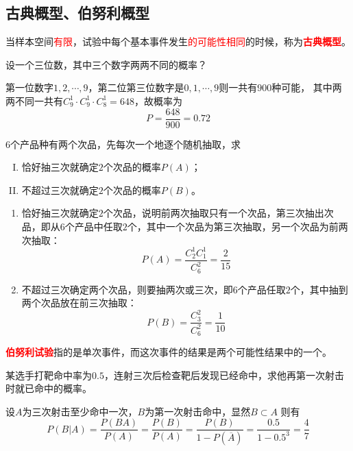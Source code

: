 \subsection{古典概型、伯努利概型}
当样本空间\textcolor{red}{有限}，试验中每个基本事件发生\textcolor{red}{的可能性相同}的时候，称为\textcolor{red}{\textbf{\textsf{古典概型}}}。
\begin{example}
    设一个三位数，其中三个数字两两不同的概率？
\end{example}
\begin{solution}
    第一位数字$1,2,\cdots,9$，第二位第三位数字是$0,1,\cdots,9$则一共有$900$种可能，
    其中两两不同一共有$C_9^1\cdot C_9^1\cdot C_8^1=648$，故概率为
    \[ P=\frac{648}{900} = 0.72 \]
\end{solution}
\begin{example}
    $6$个产品种有两个次品，先每次一个地逐个随机抽取，求
    \begin{enumerate}[(I)]
        \item 恰好抽三次就确定$2$个次品的概率$P(A)$；
        \item 不超过三次就确定$2$个次品的概率$P(B)$。
    \end{enumerate}
\end{example}
\begin{solution}
    \begin{enumerate}[(1)]
        \item 恰好抽三次就确定$2$个次品，说明前两次抽取只有一个次品，第三次抽出次品，即从$6$个产品中任取$2$个，其中一个次品为第三次抽取，另一个次品为前两次抽取：
              \[ P(A) = \frac{C_2^1C_1^1}{C_6^2} = \frac{2}{15} \]
        \item 不超过三次确定两个次品，则要抽两次或三次，即$6$个产品任取$2$个，其中抽到两个次品放在前三次抽取：
              \[ P(B) = \frac{C_3^2}{C_6^2} = \frac{1}{10} \]
    \end{enumerate}
\end{solution}

\textcolor{red}{\textbf{\textsf{伯努利试验}}}指的是单次事件，而这次事件的结果是两个可能性结果中的一个。
\begin{example}
    某选手打靶命中率为$0.5$，连射三次后检查靶后发现已经命中，求他再第一次射击时就已命中的概率。
\end{example}
\begin{solution}
    设$A$为三次射击至少命中一次，$B$为第一次射击命中，显然$B\subset A$
    则有
    \[ P(B|A) = \frac{P(BA)}{P(A)} = \frac{P(B)}{P(A)} = \frac{P(B)}{1-P(\overline{A})} = \frac{0.5}{1-0.5^3} = \frac{4}{7} \]
\end{solution}
